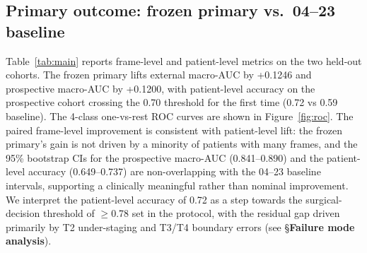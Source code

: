 \documentclass[11pt,a4paper]{article}
\begin{document}
\subsection{Primary outcome: frozen primary vs.\ 04--23 baseline}

Table~\ref{tab:main} reports frame-level and patient-level metrics on the two held-out cohorts. The frozen primary lifts external macro-AUC by +0.1246 and prospective macro-AUC by +0.1200, with patient-level accuracy on the prospective cohort crossing the 0.70 threshold for the first time (0.72 vs 0.59 baseline). The 4-class one-vs-rest ROC curves are shown in Figure~\ref{fig:roc}. The paired frame-level improvement is consistent with patient-level lift: the frozen primary's gain is not driven by a minority of patients with many frames, and the 95\% bootstrap CIs for the prospective macro-AUC (0.841--0.890) and the patient-level accuracy (0.649--0.737) are non-overlapping with the 04--23 baseline intervals, supporting a clinically meaningful rather than nominal improvement. We interpret the patient-level accuracy of 0.72 as a step towards the surgical-decision threshold of $\geq$0.78 set in the protocol, with the residual gap driven primarily by T2 under-staging and T3/T4 boundary errors (see §\textbf{Failure mode analysis}).
\end{document}
